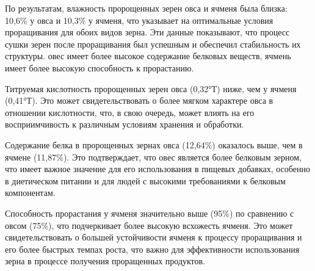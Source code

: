 
По результатам, влажность пророщенных зерен овса и ячменя была близка:
10,6\% у овса и 10,3\% у ячменя, что указывает на оптимальные условия
проращивания для обоих видов зерна. Эти данные показывают, что процесс
сушки зерен после проращивания был успешным и обеспечил стабильность их
структуры. овес имеет более высокое содержание белковых веществ, ячмень
имеет более высокую способность к прорастанию.

Титруемая кислотность пророщенных зерен овса (0,32°Т) ниже, чем у ячменя
(0,41°Т). Это может свидетельствовать о более мягком характере овса в
отношении кислотности, что, в свою очередь, может влиять на его
восприимчивость к различным условиям хранения и обработки.

Содержание белка в пророщенных зернах овса (12,64\%) оказалось выше, чем
в ячмене (11,87\%). Это подтверждает, что овес является более белковым
зерном, что имеет важное значение для его использования в пищевых
добавках, особенно в диетическом питании и для людей с высокими
требованиями к белковым компонентам.

Способность прорастания у ячменя значительно выше (95\%) по сравнению с
овсом (75\%), что подчеркивает более высокую всхожесть ячменя. Это может
свидетельствовать о большей устойчивости ячменя к процессу проращивания
и его более быстрых темпах роста, что важно для эффективности
использования зерна в процессе получения проращенных продуктов.

